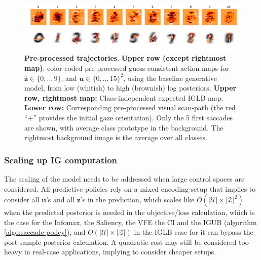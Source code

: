 \documentclass[12pt,twoside,openright]{article}
\begin{document}
\begin{figure}
	\includegraphics[width=\linewidth]{img/frontiers_sal_maps.pdf}
	\caption{\textbf{Pre-processed trajectories}. \textbf{Upper row (except rightmost map)}: color-coded pre-processed guess-consistent action maps for $\hat{\boldsymbol{z}} \in \{0,..,9\}$, and $\boldsymbol{u} \in \{0,..,15\}^2$, using the baseline generative model, from low (whitish) to high (brownish) log posteriors. \textbf{Upper row, rightmost map:} Class-independent expected IGLB map.
	\textbf{Lower row:} Corresponding pre-processed visual scan-path (the red ``+'' provides the initial gaze orientation). Only the 5 first saccades are shown, with average class prototype in the background. The rightmost background image is the average over all classes.}\label{fig:pre-processed}
\end{figure}

\subsubsection{Scaling up IG computation}
The scaling of the model needs to be addressed when large control spaces are considered. All predictive policies rely on a mixed encoding setup that implies to consider all $\boldsymbol{u}$'s and all $\boldsymbol{z}$'s in the prediction, which scales like $O(|\mathcal{U}|\times|\mathcal{Z}|^2)$ when the predicted posterior is needed in the objective/loss calculation, which is the case for the Infomax, the Saliency, the VFE the CI and the IGUB (algorithm \ref{algo:saccade-policy}), and $O(|\mathcal{U}|\times|\mathcal{Z}|)$ in the {\color{Purple}IGLB} case for it can bypass the post-sample posterior calculation. A quadratic cost may still be considered too heavy in real-case applications, implying to consider cheaper setups. 
\end{document}
